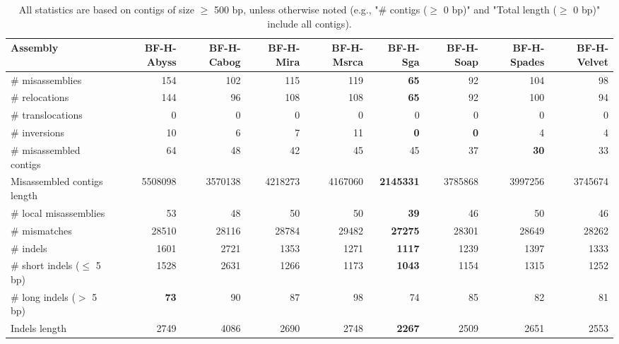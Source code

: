 \documentclass[12pt,a4paper]{article}
\begin{document}
\begin{table}[ht]
\begin{center}
\caption{All statistics are based on contigs of size $\geq$ 500 bp, unless otherwise noted (e.g., "\# contigs ($\geq$ 0 bp)" and "Total length ($\geq$ 0 bp)" include all contigs).}
\begin{tabular}{|l*{8}{|r}|}
\hline
Assembly & BF-H-Abyss & BF-H-Cabog & BF-H-Mira & BF-H-Msrca & BF-H-Sga & BF-H-Soap & BF-H-Spades & BF-H-Velvet \\ \hline
\# misassemblies & 154 & 102 & 115 & 119 & {\bf 65} & 92 & 104 & 98 \\ \hline
\hspace{5mm}\# relocations & 144 & 96 & 108 & 108 & {\bf 65} & 92 & 100 & 94 \\ \hline
\hspace{5mm}\# translocations & 0 & 0 & 0 & 0 & 0 & 0 & 0 & 0 \\ \hline
\hspace{5mm}\# inversions & 10 & 6 & 7 & 11 & {\bf 0} & {\bf 0} & 4 & 4 \\ \hline
\# misassembled contigs & 64 & 48 & 42 & 45 & 45 & 37 & {\bf 30} & 33 \\ \hline
Misassembled contigs length & 5508098 & 3570138 & 4218273 & 4167060 & {\bf 2145331} & 3785868 & 3997256 & 3745674 \\ \hline
\# local misassemblies & 53 & 48 & 50 & 50 & {\bf 39} & 46 & 50 & 46 \\ \hline
\# mismatches & 28510 & 28116 & 28784 & 29482 & {\bf 27275} & 28301 & 28649 & 28262 \\ \hline
\# indels & 1601 & 2721 & 1353 & 1271 & {\bf 1117} & 1239 & 1397 & 1333 \\ \hline
\hspace{5mm}\# short indels ($\leq$ 5 bp) & 1528 & 2631 & 1266 & 1173 & {\bf 1043} & 1154 & 1315 & 1252 \\ \hline
\hspace{5mm}\# long indels ($>$ 5 bp) & {\bf 73} & 90 & 87 & 98 & 74 & 85 & 82 & 81 \\ \hline
Indels length & 2749 & 4086 & 2690 & 2748 & {\bf 2267} & 2509 & 2651 & 2553 \\ \hline
\end{tabular}
\end{center}
\end{table}
\end{document}
